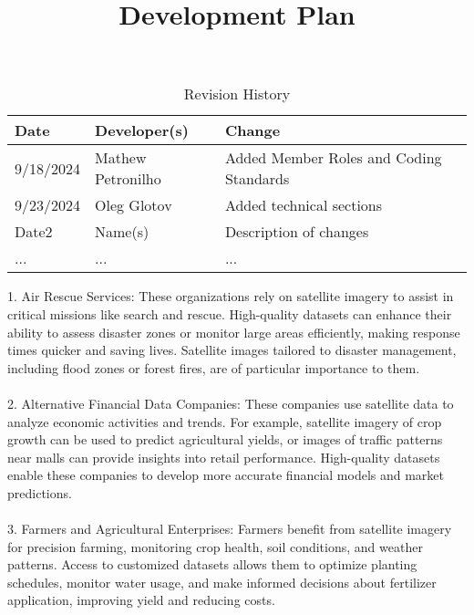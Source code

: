 \documentclass{article}
\title{Development Plan\\\progname}
\author{\authname}
\date{}
\begin{document}
\maketitle

\begin{table}[hp]
\caption{Revision History} \label{TblRevisionHistory}
\begin{tabularx}{\textwidth}{llX}
\toprule
\textbf{Date} & \textbf{Developer(s)} & \textbf{Change}\\
\midrule
9/18/2024 & Mathew Petronilho & Added Member Roles and Coding Standards\\
9/23/2024 & Oleg Glotov & Added technical sections\\
Date2 & Name(s) & Description of changes\\
... & ... & ...\\
\bottomrule
\end{tabularx}
\end{table}

\newpage{}



1.	Air Rescue Services: These organizations rely on satellite imagery to assist in critical missions like search and rescue. High-quality datasets can enhance their ability to assess disaster zones or monitor large areas efficiently, making response times quicker and saving lives. Satellite images tailored to disaster management, including flood zones or forest fires, are of particular importance to them. \\
\\

2.	Alternative Financial Data Companies: These companies use satellite data to analyze economic activities and trends. For example, satellite imagery of crop growth can be used to predict agricultural yields, or images of traffic patterns near malls can provide insights into retail performance. High-quality datasets enable these companies to develop more accurate financial models and market predictions. \\
\\

3.	Farmers and Agricultural Enterprises: Farmers benefit from satellite imagery for precision farming, monitoring crop health, soil conditions, and weather patterns. Access to customized datasets allows them to optimize planting schedules, monitor water usage, and make informed decisions about fertilizer application, improving yield and reducing costs. \\
\\
\end{document}
